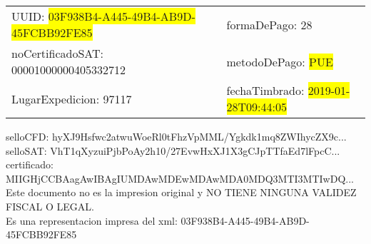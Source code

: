 \documentclass{article}
\begin{document}
\begin{tabular}{p{11cm}p{1cm}p{8cm}}
\bigskip
UUID: \colorbox{yellow}{ 03F938B4-A445-49B4-AB9D-45FCBB92FE85 } & & formaDePago: 28\\

noCertificadoSAT: 00001000000405332712 & & metodoDePago: \colorbox{yellow}{ PUE }\\

LugarExpedicion: 97117 & & fechaTimbrado: \colorbox{yellow}{ 2019-01-28T09:44:05 } \\
\end{tabular}

\bigskip
selloCFD: hyXJ9Hsfwc2atwuWoeRl0tFhzVpMML/Ygkdk1mq8ZWIhycZX9c... \\
selloSAT: VhT1qXyzuiPjbPoAy2h10/27EvwHxXJ1X3gCJpTTfaEd7lFpcC... \\

certificado: MIIGHjCCBAagAwIBAgIUMDAwMDEwMDAwMDA0MDQ3MTI3MTIwDQ...\bigskip\bigskip\bigskip\bigskip\bigskip\bigskip
\\Este documento no es la impresion original y NO TIENE NINGUNA VALIDEZ FISCAL O LEGAL. \\
 Es una representacion impresa del xml:  03F938B4-A445-49B4-AB9D-45FCBB92FE85 \\
\end{document}

